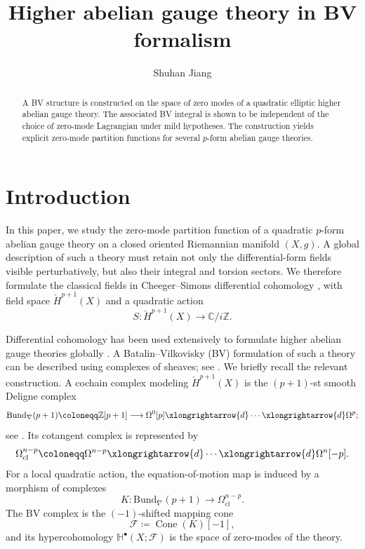 \documentclass[12pt]{amsart}
\title{Higher abelian gauge theory in BV formalism}
\author{Shuhan Jiang}
\numberwithin{table}{section}
\numberwithin{equation}{section}
\theoremstyle{plain}
\newcommand{\sF}{\mathcal{F}}
\newcommand{\C}{\mathbb{C}}
\newcommand{\Z}{\mathbb{Z}}
\begin{document}
	\begin{abstract}
		A BV structure is constructed on the space of zero modes of a quadratic elliptic higher abelian gauge theory. The associated BV integral is shown to be independent of the choice of zero-mode Lagrangian under mild hypotheses. The construction yields explicit zero-mode partition functions for several $p$-form abelian gauge theories.
	\end{abstract}
	\maketitle
	
	\section{Introduction}

In this paper, we study the zero-mode partition function of a quadratic $p$-form abelian gauge theory on a closed oriented Riemannian manifold $(X,g)$. A global description of such a theory must retain not only the differential-form fields visible perturbatively, but also their integral and torsion sectors. We therefore formulate the classical fields in Cheeger--Simons differential cohomology \cite{CheegerSimons}, with field space $\check H^{p+1}(X)$ and a quadratic action
\[
S:\check H^{p+1}(X)\longrightarrow \C/i\Z.
\]

Differential cohomology has been used extensively to formulate higher abelian gauge theories globally \cite{BelovMoore, FreedMooreSegal,Szabo2012,BeckerBeniniSchenkelSzabo,MooreSaxena}. A Batalin--Vilkovisky (BV) formulation of such a theory can be described using complexes of sheaves; see \cite{ElliottGwilliamSaberiWilliams}. We briefly recall the relevant construction. A cochain complex modeling $\check H^{p+1}(X)$ is the $(p+1)$-st smooth Deligne complex
\[
\mathrm{Bund}_\nabla(p+1)
\coloneqq
\Z[p+1]
\longrightarrow
\Omega^0[p]
\xlongrightarrow{d}\cdots
\xlongrightarrow{d}
\Omega^p;
\]
see \cite{Brylinski}. Its cotangent complex is represented by
\[
\Omega_{\mathrm{cl}}^{n-p}
\coloneqq
\Omega^{n-p}
\xlongrightarrow{d}\cdots
\xlongrightarrow{d}
\Omega^n[-p].
\]
For a local quadratic action, the equation-of-motion map is induced by a morphism of complexes
\[
K:\mathrm{Bund}_\nabla(p+1)
\longrightarrow
\Omega_{\mathrm{cl}}^{n-p}.
\]
The BV complex is the $(-1)$-shifted mapping cone
\[
\sF\coloneqq\operatorname{Cone}(K)[-1],
\]
and its hypercohomology $\mathbb H^\bullet(X;\sF)$ is the space of zero-modes of the theory.
\end{document}
